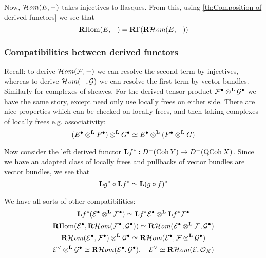 
Now, $\operatorname{\mathcal{H}\mathit{om}}(E,-)$ takes injectives to flasques. From this, using \ref{th:Composition of derived functors} we see that
\begin{equation*}
    \operatorname{\mathbf{R} Hom}(E,-)=\operatorname{\mathbf{R}\Gamma}(\operatorname{\mathbf{R}\mathcal{H}\mathit{om}}(E,-))
\end{equation*}



\subsubsection{Compatibilities between derived functors}

Recall: to derive $\operatorname{\mathcal{H}\mathit{om}}(\mathcal{F}, -)$ we can resolve the second term by injectives, whereas to derive $\operatorname{\mathcal{H}\mathit{om}}(-,\mathcal{G})$ we can resolve the first term by vector bundles. Similarly for complexes of sheaves. For the derived tensor product $\mathcal{F}^\bullet\otimes^{\mathbf{L}}\mathcal{G}^\bullet$ we have the same story, except need only use locally frees on either side. There are nice properties which can be checked on locally frees, and then taking complexes of locally frees e.g. associativity: $$(E^\bullet\otimes^{\mathbf{L}} F^\bullet)\otimes^{\mathbf{L}} G^\bullet \simeq E^\bullet\otimes^{\mathbf{L}}(F^\bullet\otimes^{\mathbf{L}} G)$$

 Now consider the left derived functor $\mathbf{L} f^*:D^-(\operatorname{Coh} Y)\to D^-(\operatorname{QCoh} X)$. Since we have an adapted class of locally frees and pullbacks of vector bundles are vector bundles, we see that
\begin{equation*}
    \mathbf{L} g^*\circ\mathbf{L} f^* \simeq \mathbf{L}(g\circ f)^*
\end{equation*}

We have all sorts of other compatibilities:
\begin{gather*}
    \mathbf{L} f^*(\mathcal{E}^\bullet\otimes^{\mathbf{L}}\mathcal{F}^\bullet)
        \simeq \mathbf{L} f^*\mathcal{E}^\bullet\otimes^{\mathbf{L}}\mathbf{L} f^*\mathcal{F}^\bullet \\
    \operatorname{\mathbf{R} Hom}(\mathcal{E}^\bullet,\operatorname{\mathbf{R}\mathcal{H}\mathit{om}}(\mathcal{F}^\bullet,\mathcal{G}^\bullet))
        \simeq \operatorname{\mathbf{R}\mathcal{H}\mathit{om}}(\mathcal{E}^\bullet\otimes^{\mathbf{L}}\mathcal{F},\mathcal{G}^\bullet) \\
    \operatorname{\mathbf{R}\mathcal{H}\mathit{om}}(\mathcal{E}^\bullet,\mathcal{F}^\bullet)\otimes^{\mathbf{L}}\mathcal{G}^\bullet
        \simeq \operatorname{\mathbf{R}\mathcal{H}\mathit{om}}(\mathcal{E}^\bullet,\mathcal{F}\otimes^{\mathbf{L}}\mathcal{G}^\bullet)\\
    \mathcal{E}^\vee\otimes^{\mathbf{L}}\mathcal{G}^\bullet
        \simeq \operatorname{\mathbf{R}\mathcal{H}\mathit{om}}(\mathcal{E}^\bullet,\mathcal{G}^\bullet), \quad
    \mathcal{E}^\vee
        \simeq \operatorname{\mathbf{R}\mathcal{H}\mathit{om}}(\mathcal{E},\mathcal{O}_X)
\end{gather*}

